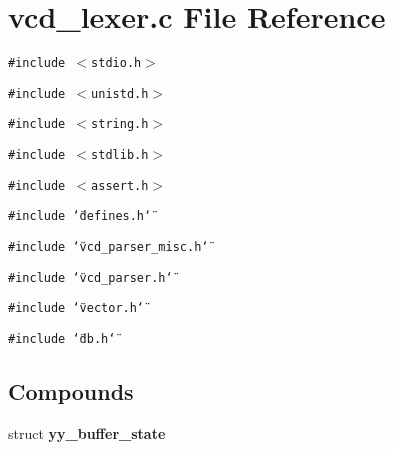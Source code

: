 \section{vcd\_\-lexer.c File Reference}
\label{vcd__lexer_8c}
{\tt \#include $<$stdio.h$>$}\par
{\tt \#include $<$unistd.h$>$}\par
{\tt \#include $<$string.h$>$}\par
{\tt \#include $<$stdlib.h$>$}\par
{\tt \#include $<$assert.h$>$}\par
{\tt \#include \char`\"{}defines.h\char`\"{}}\par
{\tt \#include \char`\"{}vcd\_\-parser\_\-misc.h\char`\"{}}\par
{\tt \#include \char`\"{}vcd\_\-parser.h\char`\"{}}\par
{\tt \#include \char`\"{}vector.h\char`\"{}}\par
{\tt \#include \char`\"{}db.h\char`\"{}}\par
\subsection*{Compounds}
\begin{CompactItemize}
\item 
struct {\bf yy\_\-buffer\_\-state}
\end{CompactItemize}
